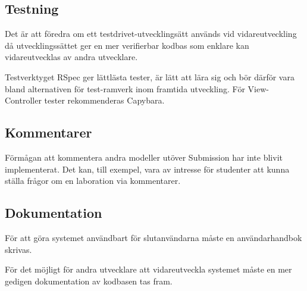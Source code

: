 \subsection{Testning}

Det är att föredra om ett testdrivet-utvecklingsätt används vid vidareutveckling då utvecklingssättet ger en mer verifierbar kodbas som enklare kan vidareutvecklas av andra utvecklare.

Testverktyget RSpec ger lättlästa tester, är lätt att lära sig och bör därför vara bland alternativen för test-ramverk inom framtida utveckling. För View-Controller tester rekommenderas Capybara.



\subsection{Kommentarer}
Förmågan att kommentera andra modeller utöver Submission har inte blivit implementerat. Det kan, till exempel, vara av intresse för studenter att kunna ställa frågor om en laboration via kommentarer. 

\subsection{Dokumentation}
För att göra systemet användbart för slutanvändarna måste en användarhandbok skrivas. 

För det möjligt för andra utvecklare att vidareutveckla systemet måste en mer gedigen dokumentation av kodbasen tas fram.
